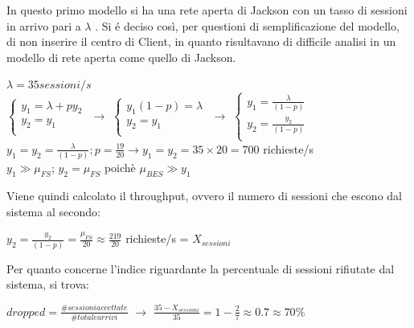 In questo primo modello si ha una rete aperta di Jackson con un tasso di 
sessioni in arrivo pari a $\lambda$ . Si \'e deciso cos\`i, per questioni di 
semplificazione del modello, di non inserire il centro di Client, in quanto
risultavano di difficile analisi in un modello di rete aperta come quello di 
Jackson.
\begin{center}
$\lambda = 35 sessioni/s$
\\ \vspace{0.5cm}
$\begin{cases} 
y_{1} = \lambda + p y_{2} \\ y_{2} = y_{1} \\
\end{cases}$  $\rightarrow$
$\begin{cases} 
y_{1}(1-p) = \lambda \\ y_{2} = y_{1} \\
\end{cases}$ $\rightarrow$
$\begin{cases} 
y_{1} =\frac{ \lambda}{(1- p)} \\ y_{2} =\frac{y_{2}}{(1-p)} \\
\end{cases}$
\\ \vspace{0.5cm}
$y_{1} = y_{2} = \frac{\lambda}{(1-p)} ; p=\frac{19}{20} \rightarrow 
y_{1} = y_{2} = 35\times20 = 700$ richieste/s
\\ \vspace{0.5cm}
$y_{1}\gg\mu_{FS}$; $y_{2}=\mu_{FS}$ poich\`e $\mu_{BES}\gg y_{1}$
\end{center}Viene quindi calcolato il throughput, ovvero il numero di sessioni che escono 
dal sistema al secondo:
\begin{center}
$y_{2} =\frac{y_{2}}{(1-p)}=\frac{\mu_{FS}}{20}\approx\frac{219}{20}$ richieste/s = $X_{sessioni}$
\end{center}
Per quanto concerne l'indice riguardante la percentuale di sessioni rifiutate 
dal sistema, si trova:
\begin{center}
 $dropped=\frac{\#sessioni accettate}{\#totale arrivi}$ $\rightarrow$ 
$\frac{35-X_{sessioni}}{35} = 1-\frac{2}{7}\approx 0.7 \approx 70\%$
\end{center}

